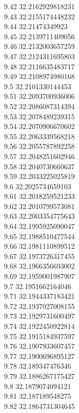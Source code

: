 {9.42	32.2162929818231\\
9.43	32.2155174448232\\
9.44	32.21474349923\\
9.45	32.2139711409056\\
9.46	32.2132003657259\\
9.47	32.2124311695803\\
9.48	32.2116635483717\\
9.49	32.2108974980168\\
9.5	32.2101330144453\\
9.51	32.2093700936006\\
9.52	32.2086087314394\\
9.53	32.2078489239315\\
9.54	32.2070906670602\\
9.55	32.2063339568218\\
9.56	32.2055787892258\\
9.57	32.2048251602946\\
9.58	32.2040730660637\\
9.59	32.2033225025819\\
9.6	32.2025734659103\\
9.61	32.2018259521233\\
9.62	32.2010799573081\\
9.63	32.2003354775643\\
9.64	32.1995925090047\\
9.65	32.1988510477544\\
9.66	32.1981110899512\\
9.67	32.1973726317455\\
9.68	32.1966356693002\\
9.69	32.1959001987907\\
9.7	32.1951662164046\\
9.71	32.1944337183421\\
9.72	32.1937027008155\\
9.73	32.1929731600497\\
9.74	32.1922450922814\\
9.75	32.1915184937597\\
9.76	32.1907933607457\\
9.77	32.1900696895127\\
9.78	32.189347476346\\
9.79	32.1886267175427\\
9.8	32.1879074094121\\
9.81	32.187189548275\\
9.82	32.1864731304645\\
}
